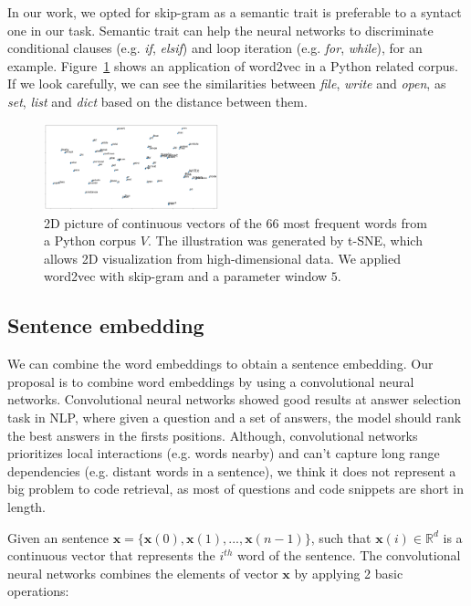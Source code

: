 \documentclass[sigconf]{acmart}
\begin{document}
In our work, we opted for skip-gram as a semantic trait is preferable to a syntact one in our task. Semantic trait can help the neural networks to discriminate conditional clauses (e.g. \emph{if}, \emph{elsif}) and loop iteration (e.g. \emph{for}, \emph{while}), for an example. Figure~\ref{fig:tsne-code-snippet-python} shows an application of word2vec in a Python related corpus. If we look carefully, we can see the similarities between \emph{file}, \emph{write} and \emph{open}, as \emph{set}, \emph{list} and \emph{dict} based on the distance between them.

\begin{figure}[H]
\includegraphics[width=0.45\textwidth]{figuras/code_tsne.png}
\caption{2D picture of continuous vectors of the 66 most frequent words from a Python corpus $V$. The illustration was generated by t-SNE, which allows 2D visualization from high-dimensional data. We applied word2vec with skip-gram and a parameter window $5$.}

\label{fig:tsne-code-snippet-python}
\end{figure}

\subsection{Sentence embedding}

We can combine the word embeddings to obtain a sentence embedding. Our proposal is to combine word embeddings by using a convolutional neural networks. Convolutional neural networks showed good results at answer selection task in NLP, where given a question and a set of answers, the model should rank the best answers in the firsts positions. Although, convolutional networks prioritizes local interactions (e.g. words nearby) and can't capture long range dependencies (e.g. distant words in a sentence), we think it does not represent a big problem to code retrieval, as most of questions and code snippets are short in length.

Given an sentence $\bm{x} = \{ \bm{x}(0), \bm{x}(1), . . ., \bm{x}(n - 1) \}$, such that $\bm{x}(i) \in \mathbb{R}^{d}$ is a continuous vector that represents the $i^{th}$ word of the sentence. The convolutional neural networks combines the elements of vector $\bm{x}$ by applying 2 basic operations:
\end{document}
